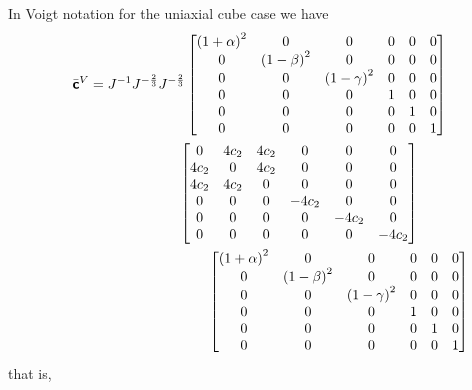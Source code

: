 In Voigt notation for the uniaxial cube case we have
\begin{multline}
  \bar{\tensorfour{c}}^{V}=\inverse{J}J^{-\frac{2}{3}}J^{-\frac{2}{3}}\begin{bmatrix}
    \pbrac{1+\alpha}^{2} & 0 & 0 & 0 & 0 & 0\\
    0 & \pbrac{1-\beta}^{2} & 0 & 0 & 0 & 0\\
    0 & 0 & \pbrac{1-\gamma}^{2} & 0 & 0 & 0\\
    0 & 0 & 0 & 1 & 0 & 0 \\
    0 & 0 & 0 & 0 & 1 & 0 \\
    0 & 0 & 0 & 0 & 0 & 1 
  \end{bmatrix}\\\hspace{2cm}\begin{bmatrix}
    0 & 4c_{2} & 4c_{2} & 0 & 0 & 0 \\
    4c_{2} & 0 & 4c_{2} & 0 & 0 & 0 \\
    4c_{2} & 4c_{2} & 0 & 0 & 0 & 0 \\
    0     & 0      & 0 & -4c_{2} & 0 & 0 \\
    0     & 0      & 0 & 0      & -4c_{2} & 0 \\
    0     & 0      & 0 & 0      & 0      & -4c_{2} 
  \end{bmatrix}\\\hspace{4cm}\begin{bmatrix}
    \pbrac{1+\alpha}^{2} & 0 & 0 & 0 & 0 & 0\\
    0 & \pbrac{1-\beta}^{2} & 0 & 0 & 0 & 0\\
    0 & 0 & \pbrac{1-\gamma}^{2} & 0 & 0 & 0\\
    0 & 0 & 0 & 1 & 0 & 0 \\
    0 & 0 & 0 & 0 & 1 & 0 \\
    0 & 0 & 0 & 0 & 0 & 1 
  \end{bmatrix}\\
\end{multline}
that is,

